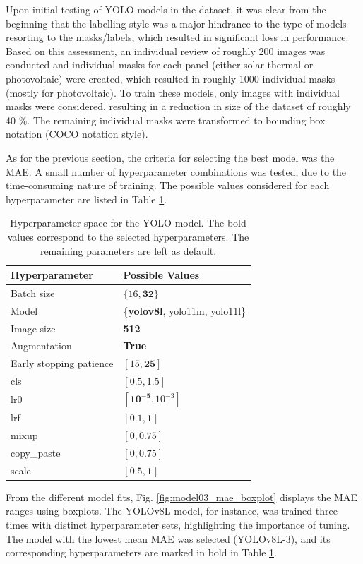 \documentclass[conference]{IEEEtran}
\begin{document}
Upon initial testing of YOLO models in the dataset, it was clear from the beginning that the labelling style was a major hindrance to the type of models resorting to the masks/labels, which resulted in significant loss in performance. Based on this assessment, an individual review of roughly 200 images was conducted and individual masks for each panel (either solar thermal or photovoltaic) were created, which resulted in roughly 1000 individual masks (mostly for photovoltaic). To train these models, only images with individual masks were considered, resulting in a reduction in size of the dataset of roughly 40 \%. The remaining individual masks were transformed to bounding box notation (COCO notation style).

As for the previous section, the criteria for selecting the best model was the MAE. A small number of hyperparameter combinations was tested, due to the time-consuming nature of training. The possible values considered for each hyperparameter are listed in Table \ref{parametrosobjid}.

\begin{table}[H]
\centering
\caption{Hyperparameter space for the YOLO model. The bold values correspond to the selected hyperparameters. The remaining parameters are left as default.}
\label{parametrosobjid}
\begin{tabular}{ll}
\toprule
\textbf{Hyperparameter} & \textbf{Possible Values} \\
\midrule
Batch size & $\{16, \mathbf{32}\}$ \\
Model & \{\textbf{yolov8l}, yolo11m, yolo11l\} \\
Image size & \textbf{512} \\
Augmentation & \textbf{True} \\
Early stopping patience & $[15, \mathbf{25}]$ \\
cls & $[0.5, \mathbf{1.5}]$ \\
lr0 & $[\mathbf{10^{-5}}, 10^{-3}]$ \\
lrf & $[0.1, \mathbf{1}]$ \\
mixup & $[0, \mathbf{0.75}]$ \\
copy\_paste & $[0, \mathbf{0.75}]$ \\
scale & $[0.5, \mathbf{1}]$ \\
\bottomrule
\end{tabular}
\end{table}

From the different model fits, Fig. \ref{fig:model03_mae_boxplot} displays the MAE ranges using boxplots. The YOLOv8L model, for instance, was trained three times with distinct hyperparameter sets, highlighting the importance of tuning. The model with the lowest mean MAE was selected (YOLOv8L-3), and its corresponding hyperparameters are marked in bold in Table \ref{parametrosobjid}.
\end{document}

